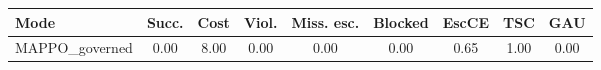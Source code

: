 \begin{tabular}{lcccccccc}
\toprule
\textbf{Mode} & \textbf{Succ.} & \textbf{Cost} & \textbf{Viol.} & \textbf{Miss. esc.} & \textbf{Blocked} & \textbf{EscCE} & \textbf{TSC} & \textbf{GAU} \\
\midrule
MAPPO_governed & 0.00 & 8.00 & 0.00 & 0.00 & 0.00 & 0.65 & 1.00 & 0.00 \\
\bottomrule
\end{tabular}
